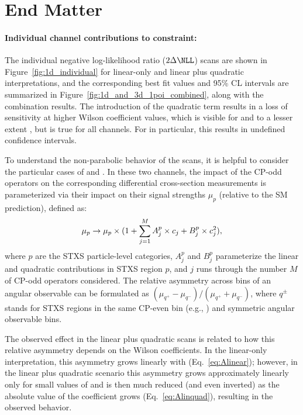 \documentclass[PAPER, atlasdraft=false, cernpreprint,UKenglish, texmf, orcidlogo]{atlasdoc}
\begin{document}
\clearpage
\section*{End Matter}






\paragraph{Individual channel contributions to \cHWtil constraint:} The individual negative log-likelihood ratio ($2\Delta\NLL$) scans are shown in Figure~\ref{fig:1d_individual} for linear-only and linear plus quadratic interpretations, and the corresponding best fit values and 95\% CL intervals are summarized in Figure~\ref{fig:1d_and_3d_1poi_combined}, along with the combination results. The introduction of the quadratic term results in a loss of sensitivity at higher Wilson coefficient values, which is visible for \WHbb and to a lesser extent \HWW, but is true for all channels. For \WHbb in particular, this results in undefined confidence intervals.

To understand the non-parabolic behavior of the \NLL scans, it is helpful to consider the particular cases of \WHbb and \HWW. In these two channels, the impact of the CP-odd operators on the corresponding differential cross-section measurements is parameterized via their impact on their signal strengths $\mu_p$ (relative to the SM prediction), defined as:
\begin{equation}
\mu_p\to \mu_p \times \large(1+\sum_{j=1}^{M}A_j^{p}\times c_j + B_j^{p}\times c_j^2 \large),

\end{equation}
where $p$ are the STXS particle-level categories, $A_{j}^{p}$ and $B_{j}^{p}$ parameterize the linear and quadratic contributions in STXS region $p$, and $j$ runs through the number $M$ of CP-odd operators considered. The relative asymmetry across bins of an angular observable can be formulated as $(\mu_{q^+}-\mu_{q^-})/(\mu_{q^+} +\mu_{q^-})$, where $q^\pm$ stands for STXS regions in the same CP-even bin (e.g., \pTW) and symmetric angular observable bins.

The observed effect in the linear plus quadratic \NLL scans is related to how this relative asymmetry depends on the Wilson coefficients. In the linear-only interpretation, this asymmetry grows linearly with \cHWtil (Eq.~\ref{eq:Alinear}); however, in the linear plus quadratic scenario this asymmetry grows approximately linearly only for small values of \cHWtil and is then much reduced (and even inverted) as the absolute value of the coefficient grows (Eq.~\ref{eq:Alinquad}), resulting in the observed \NLL behavior.
\end{document}
